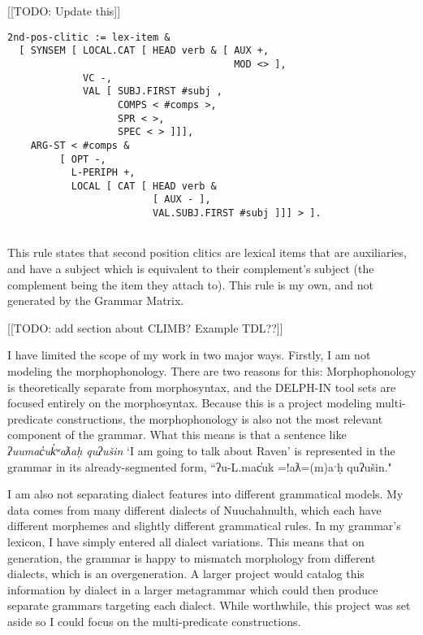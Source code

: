 [[TODO: Update this]]

\begin{verbatim}
2nd-pos-clitic := lex-item &
  [ SYNSEM [ LOCAL.CAT [ HEAD verb & [ AUX +,
				                       MOD <> ],
             VC -,
             VAL [ SUBJ.FIRST #subj ,
                   COMPS < #comps >,
                   SPR < >,
                   SPEC < > ]]],
    ARG-ST < #comps &
         [ OPT -,
           L-PERIPH +,
           LOCAL [ CAT [ HEAD verb &
                         [ AUX - ],
                         VAL.SUBJ.FIRST #subj ]]] > ].
	
\end{verbatim}

\noindent This rule states that second position clitics are lexical items that are auxiliaries, and have a subject which is equivalent to their complement's subject (the complement being the item they attach to). This rule is my own, and not generated by the Grammar Matrix.

[[TODO: add section about CLIMB? Example TDL??]]

I have limited the scope of my work in two major ways. Firstly, I am not modeling the morphophonology. There are two reasons for this: Morphophonology is theoretically separate from morphosyntax, and the DELPH-IN tool sets are focused entirely on the morphosyntax. Because this is a project modeling multi-predicate constructions, the morphophonology is also not the most relevant component of the grammar. What this means is that a sentence like \textit{ʔuumac̓uk̓ʷaƛaḥ quʔušin} `I am going to talk about Raven' is represented in the grammar in its already-segmented form, ``ʔu-L.mac̓uk =!aƛ=(m)aˑḥ quʔušin."

I am also not separating dialect features into different grammatical models. My data comes from many different dialects of Nuuchahnulth, which each have different morphemes and slightly different grammatical rules. In my grammar's lexicon, I have simply entered all dialect variations. This means that on generation, the grammar is happy to mismatch morphology from different dialects, which is an overgeneration. A larger project would catalog this information by dialect in a larger metagrammar which could then produce separate grammars targeting each dialect. While worthwhile, this project was set aside so I could focus on the multi-predicate constructions.

